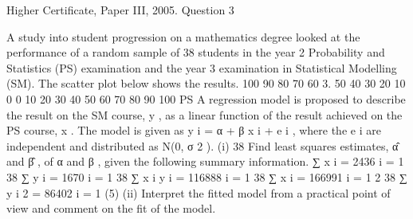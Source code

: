 \documentclass[a4paper,12pt]{article}
\begin{document}
Higher Certificate, Paper III, 2005. Question 3
\begin{framed}

A study into student progression on a mathematics degree looked at the performance
of a random sample of 38 students in the year 2 Probability and Statistics (PS)
examination and the year 3 examination in Statistical Modelling (SM). The scatter
plot below shows the results.
100
90
80
70
60
3.
50
40
30
20
10
0
0
10
20
30
40
50
60
70
80
90
100
PS
A regression model is proposed to describe the result on the SM course, y , as a linear function of the result achieved on the PS course, x .
The model is given as y i = α + β x i + e i , where the { e i } are independent and distributed as N(0, σ 2 ).
(i)
38
Find least squares estimates, α̂ and β̂ , of α and β , given the following
summary information.
∑ x i = 2436
i = 1
38
∑ y i = 1670
i = 1
38
∑ x i y i = 116888
i = 1
38
∑ x i = 166991
i = 1
2
38
∑ y
i
2
= 86402
i = 1
(5)
(ii) Interpret the fitted model from a practical point of view and comment on the fit
of the model.
\end{framed}

\end{document}
